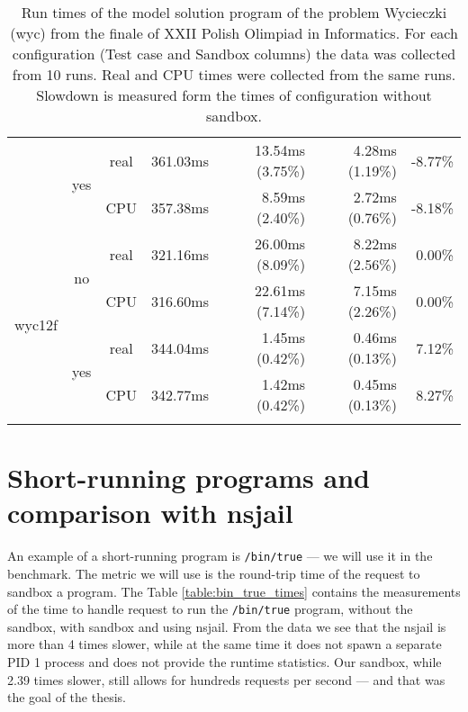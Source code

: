 \documentclass[en]{pracamgr}
\begin{document}
\begin{small}
\begin{longtable}{|l|c|c|r|r|r|r|}
                          \cline{2-7}
                          & \multirow{2}{*}{yes} & real & 361.03ms & 13.54ms (3.75\%) & 4.28ms (1.19\%) & -8.77\% \\*
                          &                      & CPU  & 357.38ms & 8.59ms (2.40\%) & 2.72ms (0.76\%) & -8.18\% \\
\hline
\multirow{4}{*}{wyc12f}   & \multirow{2}{*}{no}  & real & 321.16ms & 26.00ms (8.09\%) & 8.22ms (2.56\%) & 0.00\% \\*
                          &                      & CPU  & 316.60ms & 22.61ms (7.14\%) & 7.15ms (2.26\%) & 0.00\% \\*
                          \cline{2-7}
                          & \multirow{2}{*}{yes} & real & 344.04ms & 1.45ms (0.42\%) & 0.46ms (0.13\%) & 7.12\% \\*
                          &                      & CPU  & 342.77ms & 1.42ms (0.42\%) & 0.45ms (0.13\%) & 8.27\% \\
\hline
\caption{Run times of the model solution program of the problem Wycieczki (wyc) from the finale of XXII Polish Olimpiad in Informatics. For each configuration (Test case and Sandbox columns) the data was collected from 10 runs. Real and CPU times were collected from the same runs. Slowdown is measured form the times of configuration without sandbox.}
\label{table:wyc_model_solution_runtimes}
\end{longtable}
\end{small}

\section{Short-running programs and comparison with nsjail}

An example of a short-running program is \texttt{/bin/true} --- we will use it in the benchmark. The metric we will use is the round-trip time of the request to sandbox a program. The Table \ref{table:bin_true_times} contains the measurements of the time to handle request to run the \texttt{/bin/true} program, without the sandbox, with sandbox and using nsjail. From the data we see that the nsjail is more than 4 times slower, while at the same time it does not spawn a separate PID 1 process and does not provide the runtime statistics. Our sandbox, while 2.39 times slower, still allows for hundreds requests per second --- and that was the goal of the thesis.
\end{document}
